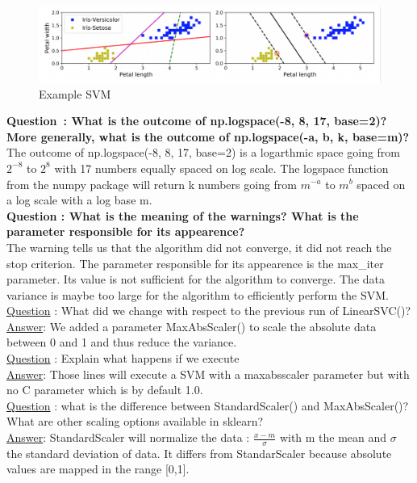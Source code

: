 \begin{figure}[ht]
	\centering 
	\includegraphics[scale = 0.35]{Pics/SVM}
	\caption{Example SVM}
\end{figure}

\textbf{{Question} : What is the outcome of np.logspace(-8, 8, 17, base=2)? More generally, what is the outcome of np.logspace(-a, b, k, base=m)?}\\
The outcome of np.logspace(-8, 8, 17, base=2) is a logarthmic space going from $2^{-8}$ to $2^8$ with 17 numbers equally spaced on log scale.
 The logspace function from the numpy package will return k numbers going from $m^{-a}$ to $m^b$ spaced on a log scale with a log base m. \\

\textbf{Question : What is the meaning of the warnings? What is the parameter responsible for its appearence?}\\
The warning tells us that the algorithm did not converge, it did not reach the stop criterion. The parameter responsible for its appearence is the max\_iter parameter. Its value is not sufficient for the algorithm to converge. The data variance is maybe too large for the algorithm to efficiently perform the SVM. \\

\underline{Question} : What did we change with respect to the previous run of LinearSVC()? \\
\underline{Answer}: We added a parameter MaxAbsScaler() to scale the absolute data between 0 and 1 and thus reduce the variance. \\

\underline{Question} : Explain what happens if we execute \\
\underline{Answer}: Those lines will execute a SVM with a maxabsscaler parameter but with no C parameter which is by default 1.0.\\

\underline{Question} : what is the difference between StandardScaler() and MaxAbsScaler()? What are other scaling options available in sklearn? \\
\underline{Answer}: StandardScaler will normalize the data : $\frac{x-m}{\sigma}$ with m the mean and $\sigma$ the standard deviation of data. It differs from StandarScaler because absolute values are mapped in the range [0,1]. \\

